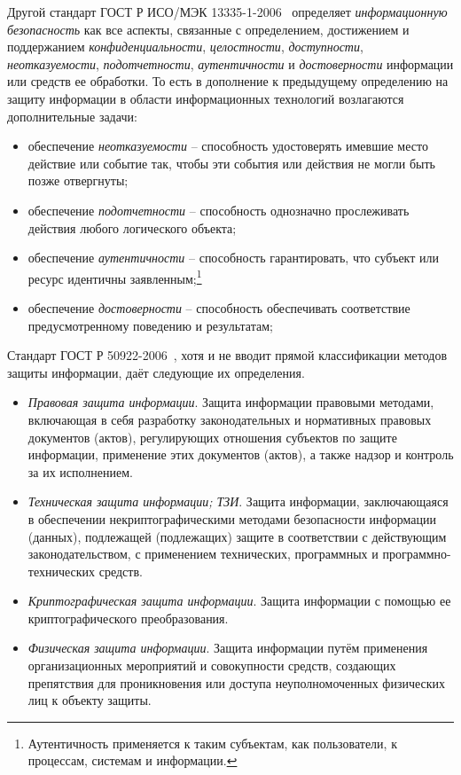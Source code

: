Другой стандарт ГОСТ Р ИСО/МЭК 13335-1-2006~\cite{GOST-13335-1-2006} определяет \emph{информационную безопасность} как все аспекты, связанные с определением, достижением и поддержанием \emph{конфиденциальности}, \emph{целостности}, \emph{доступности}, \emph{неотказуемости}, \emph{подотчетности}, \emph{аутентичности} и \emph{достоверности} информации или средств ее обработки. То есть в дополнение к предыдущему определению на защиту информации в области информационных технологий возлагаются дополнительные задачи:
\begin{itemize}
	\item обеспечение \emph{неотказуемости} -- способность удостоверять имевшие место действие или событие так, чтобы эти события или действия не могли быть позже отвергнуты;
	\item обеспечение \emph{подотчетности} -- способность однозначно прослеживать действия любого логического объекта;
	\item обеспечение \emph{аутентичности} -- способность гарантировать, что субъект или ресурс идентичны заявленным;\footnote{Аутентичность применяется к таким субъектам, как пользователи, к процессам, системам и информации.}
	\item обеспечение \emph{достоверности} -- способность обеспечивать соответствие предусмотренному поведению и результатам;
\end{itemize}

Стандарт ГОСТ Р 50922-2006~\cite{GOST-50922-2006}, хотя и не вводит прямой классификации методов защиты информации, даёт следующие их определения.
\begin{itemize}
	\item \emph{Правовая защита информации}. Защита информации правовыми методами, включающая в себя разработку законодательных и нормативных правовых документов (актов), регулирующих отношения субъектов по защите информации, применение этих документов (актов), а также надзор и контроль за их исполнением.
	\item \emph{Техническая защита информации; ТЗИ}. Защита информации, заключающаяся в обеспечении некриптографическими методами безопасности информации (данных), подлежащей (подлежащих) защите в соответствии с действующим законодательством, с применением технических, программных и программно-технических средств.
	\item \emph{Криптографическая защита информации}. Защита информации с помощью ее криптографического преобразования.
	\item \emph{Физическая защита информации}. Защита информации путём применения организационных мероприятий и совокупности средств, создающих препятствия для проникновения или доступа неуполномоченных физических лиц к объекту защиты.
\end{itemize}

